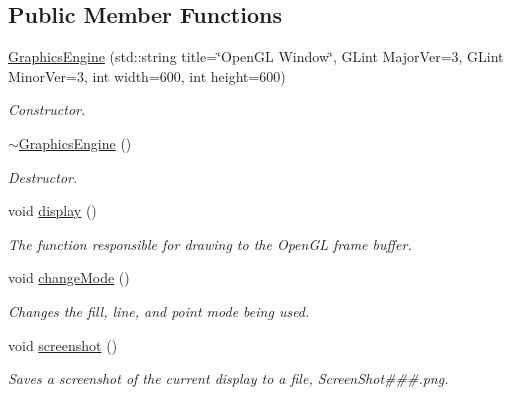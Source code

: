 \subsection*{Public Member Functions}
\begin{DoxyCompactItemize}
\item 
\hyperlink{class_graphics_engine_a458fa2b36f864e0820a0a54ad58ff1c3}{Graphics\+Engine} (std\+::string title=\char`\"{}Open\+GL Window\char`\"{}, G\+Lint Major\+Ver=3, G\+Lint Minor\+Ver=3, int width=600, int height=600)
\begin{DoxyCompactList}\small\item\em Constructor. \end{DoxyCompactList}\item 
\hyperlink{class_graphics_engine_ab67afeefbc9f1c284f6ce310c31ae8f6}{$\sim$\+Graphics\+Engine} ()
\begin{DoxyCompactList}\small\item\em Destructor. \end{DoxyCompactList}\item 
void \hyperlink{class_graphics_engine_a2f0bdf1a47bf9e8d4f1c9525c2ebc8f9}{display} ()
\begin{DoxyCompactList}\small\item\em The function responsible for drawing to the Open\+GL frame buffer. \end{DoxyCompactList}\item 
\mbox{\label{class_graphics_engine_a7f549d3ad00c34e61d067fdd2a911034}} 
void \hyperlink{class_graphics_engine_a7f549d3ad00c34e61d067fdd2a911034}{change\+Mode} ()
\begin{DoxyCompactList}\small\item\em Changes the fill, line, and point mode being used. \end{DoxyCompactList}\item 
\mbox{\label{class_graphics_engine_a7b12982b41cbdb107f48863798be2ed7}} 
void \hyperlink{class_graphics_engine_a7b12982b41cbdb107f48863798be2ed7}{screenshot} ()
\begin{DoxyCompactList}\small\item\em Saves a screenshot of the current display to a file, Screen\+Shot\#\#\#.png. \end{DoxyCompactList}\item 
\mbox{\label{class_graphics_engine_a6a38e40ee4227a8b53dddf07f92323ee}} 

\end{DoxyCompactItemize}
